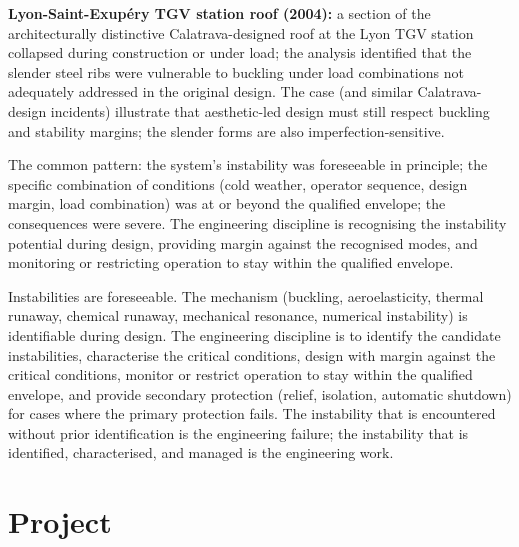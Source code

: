 \textbf{Lyon-Saint-Exup\'ery TGV station roof (2004):} a section of the architecturally distinctive Calatrava-designed roof at the Lyon TGV station collapsed during construction or under load; the analysis identified that the slender steel ribs were vulnerable to buckling under load combinations not adequately addressed in the original design. The case (and similar Calatrava-design incidents) illustrate that aesthetic-led design must still respect buckling and stability margins; the slender forms are also imperfection-sensitive.

The common pattern: the system's instability was foreseeable in principle; the specific combination of conditions (cold weather, operator sequence, design margin, load combination) was at or beyond the qualified envelope; the consequences were severe. The engineering discipline is recognising the instability potential during design, providing margin against the recognised modes, and monitoring or restricting operation to stay within the qualified envelope.

\begin{principle}
Instabilities are foreseeable. The mechanism (buckling, aeroelasticity, thermal runaway, chemical runaway, mechanical resonance, numerical instability) is identifiable during design. The engineering discipline is to identify the candidate instabilities, characterise the critical conditions, design with margin against the critical conditions, monitor or restrict operation to stay within the qualified envelope, and provide secondary protection (relief, isolation, automatic shutdown) for cases where the primary protection fails. The instability that is encountered without prior identification is the engineering failure; the instability that is identified, characterised, and managed is the engineering work.
\end{principle}

\section{Project}

